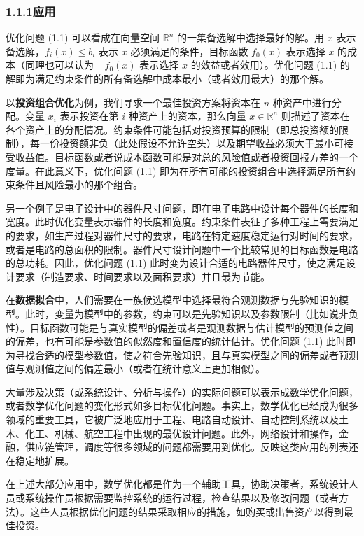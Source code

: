 \documentclass[UTF8,12pt,a4paper,fontset=fandol]{ctexart}
\begin{document}
\subsubsection*{1.1.1\quad 应用}

优化问题 (1.1) 可以看成在向量空间 $\mathbb{R}^n$ 的一集备选解中选择最好的解。用 $x$ 表示备选解，$f_i(x)\le b_i$ 表示 $x$ 必须满足的条件，目标函数 $f_0(x)$ 表示选择 $x$ 的成本（同理也可以认为 $-f_0(x)$ 表示选择 $x$ 的效益或者效用）。优化问题 (1.1) 的解即为满足约束条件的所有备选解中成本最小（或者效用最大）的那个解。

以\textbf{投资组合优化}为例，我们寻求一个最佳投资方案将资本在 $n$ 种资产中进行分配。变量 $x_i$ 表示投资在第 $i$ 种资产上的资本，那么向量 $x\in\mathbb{R}^n$ 则描述了资本在各个资产上的分配情况。约束条件可能包括对投资预算的限制（即总投资额的限制），每一份投资额非负（此处假设不允许空头）以及期望收益必须大于最小可接受收益值。目标函数或者说成本函数可能是对总的风险值或者投资回报方差的一个度量。在此意义下，优化问题 (1.1) 即为在所有可能的投资组合中选择满足所有约束条件且风险最小的那个组合。

另一个例子是电子设计中的器件尺寸问题，即在电子电路中设计每个器件的长度和宽度。此时优化变量表示器件的长度和宽度。约束条件表征了多种工程上需要满足的要求，如生产过程对器件尺寸的要求，电路在特定速度稳定运行对时间的要求，或者是电路的总面积的限制。器件尺寸设计问题中一个比较常见的目标函数是电路的总功耗。因此，优化问题 (1.1) 此时变为设计合适的电路器件尺寸，使之满足设计要求（制造要求、时间要求以及面积要求）并且最为节能。

在\textbf{数据拟合}中，人们需要在一族候选模型中选择最符合观测数据与先验知识的模型。此时，变量为模型中的参数，约束可以是先验知识以及参数限制（比如说非负性）。目标函数可能是与真实模型的偏差或者是观测数据与估计模型的预测值之间的偏差，也有可能是参数值的似然度和置信度的统计估计。优化问题 (1.1) 此时即为寻找合适的模型参数值，使之符合先验知识，且与真实模型之间的偏差或者预测值与观测值之间的偏差最小（或者在统计意义上更加相似）。

大量涉及决策（或系统设计、分析与操作）的实际问题可以表示成数学优化问题，或者数学优化问题的变化形式如多目标优化问题。事实上，数学优化已经成为很多领域的重要工具，它被广泛地应用于工程、电路自动设计、自动控制系统以及土木、化工、机械、航空工程中出现的最优设计问题。此外，网络设计和操作，金融，供应链管理，调度等很多领域的问题都需要用到优化。反映这类应用的列表还在稳定地扩展。

在上述大部分应用中，数学优化都是作为一个辅助工具，协助决策者，系统设计人员或系统操作员根据需要监控系统的运行过程，检查结果以及修改问题（或者方法）。这些人员根据优化问题的结果采取相应的措施，如购买或出售资产以得到最佳投资。
\end{document}

